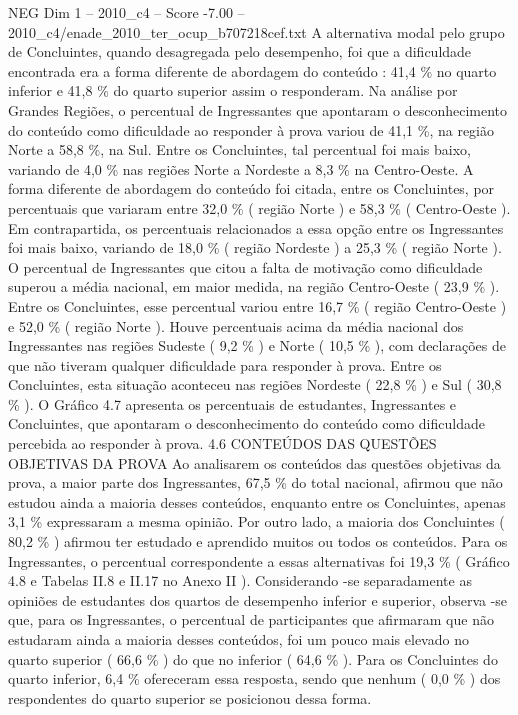 \begin{textsample}{NEG Dim 1 – 2010\_c4 – Score -7.00 – 2010\_c4/enade\_2010\_ter\_ocup\_b707218cef.txt}
A alternativa modal pelo grupo de Concluintes, quando desagregada pelo desempenho, foi que a dificuldade encontrada era a forma diferente de abordagem do conteúdo : 41,4 \% no quarto inferior e 41,8 \% do quarto superior assim o responderam.
Na análise por Grandes Regiões, o percentual de Ingressantes que apontaram o desconhecimento do conteúdo como dificuldade ao responder à prova variou de 41,1 \%, na região Norte a 58,8 \%, na Sul.
Entre os Concluintes, tal percentual foi mais baixo, variando de 4,0 \% nas regiões Norte a Nordeste a 8,3 \% na Centro-Oeste.
A forma diferente de abordagem do conteúdo foi citada, entre os Concluintes, por percentuais que variaram entre 32,0 \% ( região Norte ) e 58,3 \% ( Centro-Oeste ).
Em contrapartida, os percentuais relacionados a essa opção entre os Ingressantes foi mais baixo, variando de 18,0 \% ( região Nordeste ) a 25,3 \% ( região Norte ).
O percentual de Ingressantes que citou a falta de motivação como dificuldade superou a média nacional, em maior medida, na região Centro-Oeste ( 23,9 \% ).
Entre os Concluintes, esse percentual variou entre 16,7 \% ( região Centro-Oeste ) e 52,0 \% ( região Norte ).
Houve percentuais acima da média nacional dos Ingressantes nas regiões Sudeste ( 9,2 \% ) e Norte ( 10,5 \% ), com declarações de que não tiveram qualquer dificuldade para responder à prova.
Entre os Concluintes, esta situação aconteceu nas regiões Nordeste ( 22,8 \% ) e Sul ( 30,8 \% ).
O Gráfico 4.7 apresenta os percentuais de estudantes, Ingressantes e Concluintes, que apontaram o desconhecimento do conteúdo como dificuldade percebida ao responder à prova. 4.6 CONTEÚDOS DAS QUESTÕES OBJETIVAS DA PROVA Ao analisarem os conteúdos das questões objetivas da prova, a maior parte dos Ingressantes, 67,5 \% do total nacional, afirmou que não estudou ainda a maioria desses conteúdos, enquanto entre os Concluintes, apenas 3,1 \% expressaram a mesma opinião.
Por outro lado, a maioria dos Concluintes ( 80,2 \% ) afirmou ter estudado e aprendido muitos ou todos os conteúdos.
Para os Ingressantes, o percentual correspondente a essas alternativas foi 19,3 \% ( Gráfico 4.8 e Tabelas II.8 e II.17 no Anexo II ).
Considerando -se separadamente as opiniões de estudantes dos quartos de desempenho inferior e superior, observa -se que, para os Ingressantes, o percentual de participantes que afirmaram que não estudaram ainda a maioria desses conteúdos, foi um pouco mais elevado no quarto superior ( 66,6 \% ) do que no inferior ( 64,6 \% ).
Para os Concluintes do quarto inferior, 6,4 \% ofereceram essa resposta, sendo que nenhum ( 0,0 \% ) dos respondentes do quarto superior se posicionou dessa forma.

\end{textsample}
